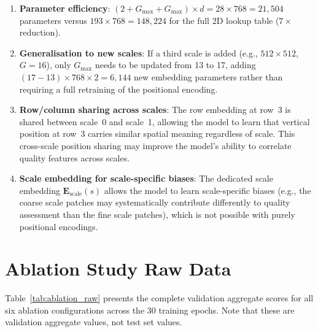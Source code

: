 \begin{enumerate}
    \item \textbf{Parameter efficiency}: $(2 + G_{\max} + G_{\max}) \times d
          = 28 \times 768 = 21{,}504$ parameters versus $193 \times 768 = 148{,}224$
          for the full 2D lookup table ($7\times$ reduction).

    \item \textbf{Generalisation to new scales}: If a third scale is added (e.g.,
          $512 \times 512$, $G = 16$), only $G_{\max}$ needs to be updated from 13 to 17,
          adding $(17 - 13) \times 768 \times 2 = 6{,}144$ new embedding parameters
          rather than requiring a full retraining of the positional encoding.

    \item \textbf{Row/column sharing across scales}: The row embedding at row~3 is
          shared between scale~0 and scale~1, allowing the model to learn that vertical
          position at row~3 carries similar spatial meaning regardless of scale. This
          cross-scale position sharing may improve the model's ability to correlate
          quality features across scales.

    \item \textbf{Scale embedding for scale-specific biases}: The dedicated scale
          embedding $\mathbf{E}_{\text{scale}}(s)$ allows the model to learn
          scale-specific biases (e.g., the coarse scale patches may systematically
          contribute differently to quality assessment than the fine scale patches),
          which is not possible with purely positional encodings.
\end{enumerate}

\section{Ablation Study Raw Data}
\label{app:ablation_raw}

Table~\ref{tab:ablation_raw} presents the complete validation aggregate scores for all
six ablation configurations across the 30 training epochs. Note that these are
validation aggregate values, not test set values.

